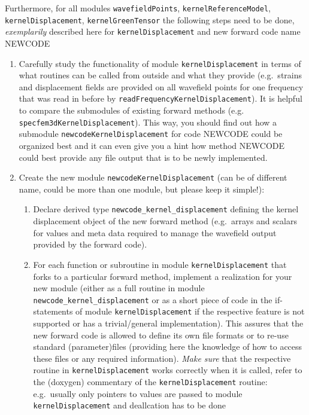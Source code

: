 \documentclass[12pt,a4paper]{article}
\newcommand{\lcode}[1]{\nolinkurl{#1}}
\begin{document}
Furthermore, for all modules \lcode{wavefieldPoints}, \lcode{kernelReferenceModel},
\lcode{kernelDisplacement},
\lcode{kernelGreenTensor} the following steps need to be done, \emph{exemplarily} described here for 
\lcode{kernelDisplacement} and new forward code name NEWCODE
\begin{enumerate}
\item Carefully study the functionality of module \lcode{kernelDisplacement} in terms of what routines can
  be called from outside and what they provide (e.g.\ strains and displacement fields are provided on all wavefield 
  points for one frequency that was read in before by \lcode{readFrequencyKernelDisplacement}).
  It is helpful to compare the submodules of existing forward methods (e.g. \lcode{specfem3dKernelDisplacement}).
  This way, you should find out how a submodule \lcode{newcodeKernelDisplacement} for code NEWCODE could be 
  organized best and it can even give you a hint how method NEWCODE could best provide any file output that is to
  be newly implemented.
\item Create the new module \lcode{newcodeKernelDisplacement} (can be of different name, could be more than one
  module, but please keep it simple!):
  \begin{enumerate}
  \item Declare derived type \lcode{newcode_kernel_displacement} defining the kernel displacement object of the new 
    forward method (e.g.\ arrays and scalars for values and meta data required to manage the wavefield output
    provided by the forward code).
  \item For each function or subroutine in module \lcode{kernelDisplacement} that forks to a particular 
    forward method, implement a realization for your new module (either as a full routine in module 
    \lcode{newcode_kernel_displacement} or as a short piece of code in the if-statements of module 
    \lcode{kernelDisplacement} if the respective feature is not supported or has a trivial/general implementation).
    This assures that the new forward code is allowed to define its own file formats or to re-use standard 
    (parameter)files (providing here the knowledge of how to access these files or any required information).
    \emph{Make sure} that the respective routine in \lcode{kernelDisplacement} works correctly when it is called, 
      refer to the (doxygen) commentary of the \lcode{kernelDisplacement} routine: e.g.\ usually only pointers to 
      values are passed to module \lcode{kernelDisplacement} and deallcation has to be done 

\end{enumerate}
\end{enumerate}
\end{document}
